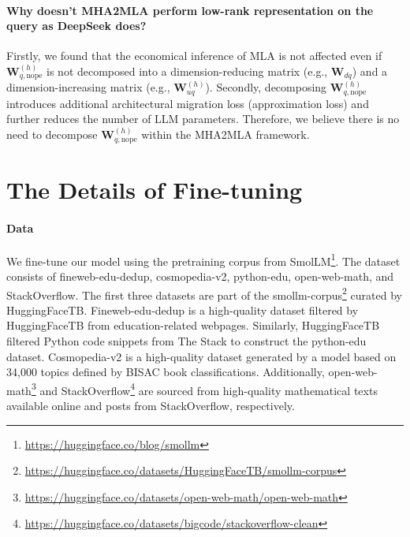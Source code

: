 \paragraph{Why doesn't MHA2MLA perform low-rank representation on the query as DeepSeek does?}
Firstly, we found that the economical inference of MLA is not affected even if $\bm{W}_{q,\text{nope}}^{(h)}$ is not decomposed into a dimension-reducing matrix (e.g., $\bm{W}_{dq}$) and a dimension-increasing matrix (e.g., $\bm{W}_{uq}^{(h)}$). 
Secondly, decomposing $\bm{W}_{q,\text{nope}}^{(h)}$ introduces additional architectural migration loss (approximation loss) and further reduces the number of LLM parameters. 
Therefore, we believe there is no need to decompose $\bm{W}_{q,\text{nope}}^{(h)}$ within the MHA2MLA framework.


\section{The Details of Fine-tuning}
\label{app:ft_details}

\paragraph{Data}


We fine-tune our model using the pretraining corpus from SmolLM\footnote{\url{https://huggingface.co/blog/smollm}}. 
The dataset consists of fineweb-edu-dedup, cosmopedia-v2, python-edu, open-web-math, and StackOverflow. The first three datasets are part of the smollm-corpus\footnote{\url{https://huggingface.co/datasets/HuggingFaceTB/smollm-corpus}} curated by HuggingFaceTB. Fineweb-edu-dedup is a high-quality dataset filtered by HuggingFaceTB from education-related webpages. Similarly, HuggingFaceTB filtered Python code snippets from The Stack to construct the python-edu dataset. Cosmopedia-v2 is a high-quality dataset generated by a model based on 34,000 topics defined by BISAC book classifications. Additionally, open-web-math\footnote{\url{https://huggingface.co/datasets/open-web-math/open-web-math}} and StackOverflow\footnote{\url{https://huggingface.co/datasets/bigcode/stackoverflow-clean}} are sourced from high-quality mathematical texts available online and posts from StackOverflow, respectively.

